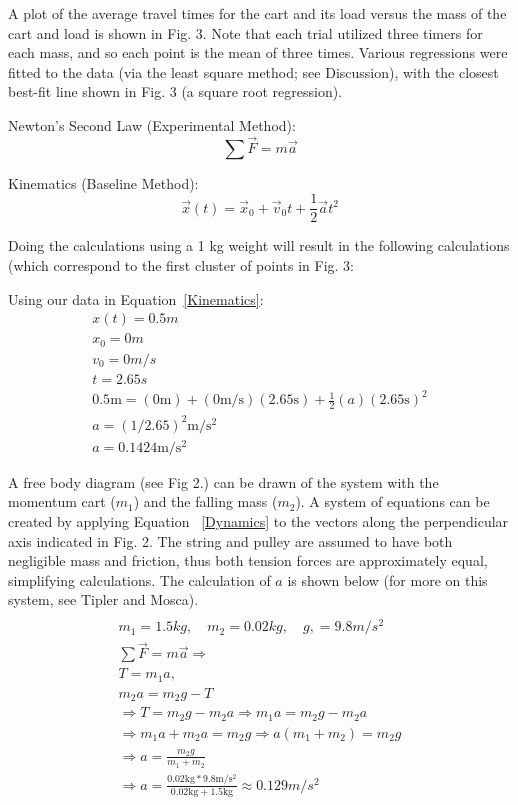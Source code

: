 \documentclass[twocolumn, 10pt]{article}
\begin{document}
\hspace{\parindent} A plot of the average travel times for the cart and its load versus the mass of the cart and load is shown in Fig. 3. Note that each trial utilized three timers for each mass, and so each point is the mean of three times. Various regressions were fitted to the data (via the least square method; see Discussion), with the closest best-fit line shown in Fig. 3 (a square root regression).

Newton's Second Law (Experimental Method): 
\begin{equation} \label{Dynamics}
    \sum\vec{F} = m\vec{a}
\end{equation}

 Kinematics (Baseline Method): 
\begin{equation} \label{Kinematics}
    \vec{x}(t) = \vec{x}_0 + \vec{v}_0t + \frac{1}{2}\vec{a} t^2
\end{equation}

Doing the calculations using a 1 kg weight will result in the following calculations (which correspond to the first cluster of points in Fig. 3:

Using our data in Equation~\eqref{Kinematics}: 
\begin{gather*}
    x(t) = 0.5m
    \\x_0 = 0m
    \\v_0 = 0m/s
    \\t = 2.65s
    \\0.5\text{m} = (0\text{m}) + (0\text{m/s})(2.65\text{s})+\frac{1}{2}(a)(2.65\text{s})^2
    \\a = (1/2.65)^2\text{m}/\text{s}^2
    \\a = 0.1424\text{m}/\text{s}^2
\end{gather*}

A free body diagram (see Fig 2.) can be drawn of the system with the momentum cart (\(m_1\)) and the falling mass (\(m_2\)). A system of equations can be created by applying Equation ~\eqref{Dynamics} to the vectors along the perpendicular axis indicated in Fig. 2. The string and pulley are assumed to have both negligible mass and friction, thus both tension forces are approximately equal, simplifying calculations. The calculation of \(a\) is shown below (for more on this system, see Tipler and Mosca).
\begin{gather*}
     \\m_1 = 1.5 kg, \quad m_2 = 0.02kg, \quad g , = 9.8m/s^2
    \\ \sum\vec{F}=m\vec{a}\Rightarrow
    \\T = m_1a, \tag{5}
    \\m_2a = m_2g - T \tag{6}
    \\ \Rightarrow T = m_2g - m_2a \Rightarrow m_1a =  m_2g - m_2a
    \\ \Rightarrow m_1a + m_2a = m_2g \Rightarrow a(m_1 + m_2) = m_2g 
    \\ \Rightarrow a = \frac{m_2g}{m_1 + m_2} \tag{7}
    \\ \Rightarrow a = \frac{0.02\text{kg}*9.8\text{m}/\text{s}^2}{0.02\text{kg}+1.5\text{kg}} \approx 0.129 m/s^2 
\end{gather*}
\end{document}

